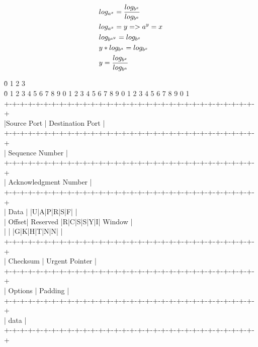 \documentclass[a4paper,10pt]{book}
\begin{document}
\begin{align}
  & log_{a^{x}} = \frac{log_{b^{x}}}{log_{b^{a}}} \notag \\
  & log_{a^{x}} = y => a^y = x \notag \\
  & log_{b^{a^{y}}} = log_{b^{x}} \notag \\
  & y*log_{b^{a}} = log_{b^{x}} \notag \\
  & y = \frac{log_{b^{x}}}{log_{b^{a}}} \notag
\end{align}


\. 0     1                   2                   3 \\
\.0 1 2 3 4 5 6 7 8 9 0 1 2 3 4 5 6 7 8 9 0 1 2 3 4 5 6 7 8 9 0 1 \\
+-+-+-+-+-+-+-+-+-+-+-+-+-+-+-+-+-+-+-+-+-+-+-+-+-+-+-+-+-+-+-+-+ \\
|\hspace*{5 em}Source Port          |       Destination Port        | \\
+-+-+-+-+-+-+-+-+-+-+-+-+-+-+-+-+-+-+-+-+-+-+-+-+-+-+-+-+-+-+-+-+ \\
|                        Sequence Number                        | \\
+-+-+-+-+-+-+-+-+-+-+-+-+-+-+-+-+-+-+-+-+-+-+-+-+-+-+-+-+-+-+-+-+ \\
|                    Acknowledgment Number                      | \\
+-+-+-+-+-+-+-+-+-+-+-+-+-+-+-+-+-+-+-+-+-+-+-+-+-+-+-+-+-+-+-+-+ \\
|  Data |           |U|A|P|R|S|F|                               | \\
| Offset| Reserved  |R|C|S|S|Y|I|            Window             | \\
|       |           |G|K|H|T|N|N|                               | \\
+-+-+-+-+-+-+-+-+-+-+-+-+-+-+-+-+-+-+-+-+-+-+-+-+-+-+-+-+-+-+-+-+ \\
|           Checksum            |         Urgent Pointer        | \\
+-+-+-+-+-+-+-+-+-+-+-+-+-+-+-+-+-+-+-+-+-+-+-+-+-+-+-+-+-+-+-+-+ \\
|                    Options                    |    Padding    | \\
+-+-+-+-+-+-+-+-+-+-+-+-+-+-+-+-+-+-+-+-+-+-+-+-+-+-+-+-+-+-+-+-+ \\
|                             data                              | \\
+-+-+-+-+-+-+-+-+-+-+-+-+-+-+-+-+-+-+-+-+-+-+-+-+-+-+-+-+-+-+-+-+
\end{document}
